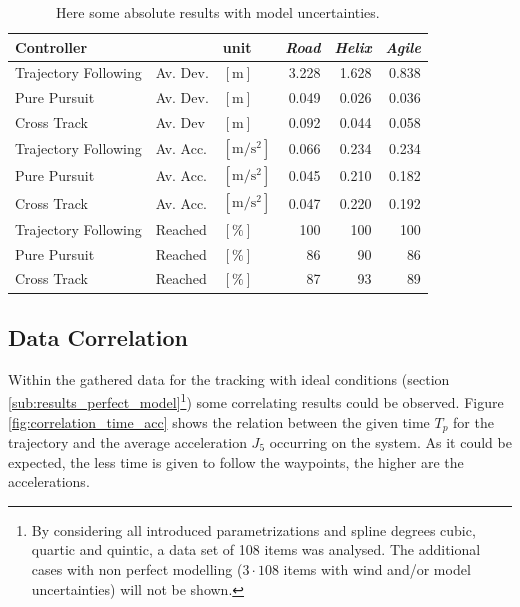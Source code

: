 \begin{table}[h]
\begin{center}
 \begin{tabular}{lll|rrr}
 \hline
 Controller &   & unit & \textit{Road} & \textit{Helix} & \textit{Agile} \\ \hline \hline
 Trajectory Following & Av. Dev. & $[\si{\meter}]$ & 3.228 & 1.628 & 0.838 \\
 Pure Pursuit         & Av. Dev. & $[\si{\meter}]$ & 0.049 & 0.026 & 0.036 \\
 Cross Track          & Av. Dev & $[\si{\meter}]$ &  0.092 & 0.044 & 0.058 \\
    
 Trajectory Following & Av. Acc. & $[\si{\meter\per\square\second}]$ & 0.066 & 0.234 & 0.234 \\
 Pure Pursuit         & Av. Acc. & $[\si{\meter\per\square\second}]$ & 0.045 & 0.210 & 0.182 \\
 Cross Track          & Av. Acc. & $[\si{\meter\per\square\second}]$ & 0.047 & 0.220 & 0.192 \\
 
 Trajectory Following & Reached & $[\si{\percent}]$ & 100 & 100 & 100 \\
 Pure Pursuit         & Reached & $[\si{\percent}]$ &  86 &  90 &  86 \\
 Cross Track          & Reached & $[\si{\percent}]$ &  87 &  93 &  89 \\
 \hline
 \end{tabular}
 \caption{Here some absolute results with model uncertainties.}\vspace{1px}
 \label{tab:results_model_uncertainties}
\end{center}
\end{table}

\subsection{Data Correlation}
Within the gathered data for the tracking with ideal conditions (section \ref{sub:results_perfect_model}\footnote{By considering all introduced parametrizations and spline degrees cubic, quartic and quintic, a data set of 108 items was analysed. The additional cases  with non perfect modelling ($3\cdot 108$ items with wind and/or model uncertainties) will not be shown.}) some correlating results could be observed. Figure \ref{fig:correlation_time_acc} shows the relation between the given time $T_p$ for the trajectory and the average acceleration $J_5$ occurring on the system. As it could be expected, the less time is given to follow the waypoints, the higher are the accelerations.

